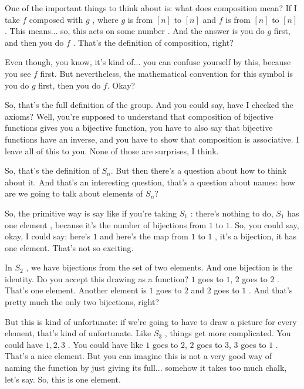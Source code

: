 \begin{speech}[01:03:59 - 01:05:31]
One of the important things to think about is: what does composition mean? If I take $f$ composed with $g$ , where $g$ is from $[n]$ to $[n]$ and $f$ is from $[n]$ to $[n]$ . This means... so, this acts on some number . And the answer is you do $g$ first, and then you do $f$ . That's the definition of composition, right?

Even though, you know, it's kind of... you can confuse yourself by this, because you see $f$ first. But nevertheless, the mathematical convention for this symbol is you do $g$ first, then you do $f$. Okay?

So, that's the full definition of the group. And you could say, have I checked the axioms? Well, you're supposed to understand that composition of bijective functions gives you a bijective function, you have to also say that bijective functions have an inverse, and you have to show that composition is associative. I leave all of this to you. None of those are surprises, I think.

So, that's the definition of $S_n$. But then there's a question about how to think about it. And that's an interesting question, that's a question about names: how are we going to talk about elements of $S_n$?

So, the primitive way is say like if you're taking $S_1$ : there's nothing to do, $S_1$ has one element , because it's the number of bijections from $1$ to $1$. So, you could say, okay, I could say: here's $1$ and here's the map from $1$ to $1$ , it's a bijection, it has one element. That's not so exciting.

In $S_2$ , we have bijections from the set of two elements. And one bijection is the identity. Do you accept this drawing as a function? $1$ goes to $1$, $2$ goes to $2$ . That's one element. Another element is $1$ goes to $2$ and $2$ goes to $1$ . And that's pretty much the only two bijections, right?

But this is kind of unfortunate: if we're going to have to draw a picture for every element, that's kind of unfortunate. Like $S_3$ , things get more complicated. You could have $1, 2, 3$ . You could have like $1$ goes to $2$, $2$ goes to $3$, $3$ goes to $1$ . That's a nice element. But you can imagine this is not a very good way of naming the function by just giving its full... somehow it takes too much chalk, let's say. So, this is one element.
\end{speech}

